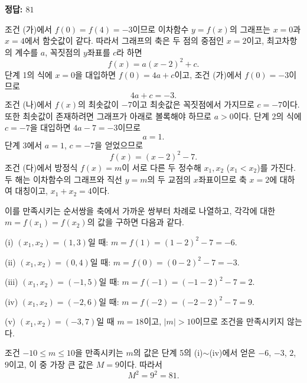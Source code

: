 \documentclass[10pt]{article}
\begin{document}
\begin{answerbox}\sffamily\bfseries 정답: $81$\end{answerbox}
 조건 (가)에서 $f(0) = f(4) = -3$이므로 이차함수 $y = f(x)$의 그래프는 $x = 0$과 $x = 4$에서 함숫값이 같다. 따라서 그래프의 축은 두 점의 중점인 $x = 2$이고, 최고차항의 계수를 $a$, 꼭짓점의 $y$좌표를 $c$라 하면
\[ f(x) = a(x - 2)^2 + c. \]
 단계 1의 식에 $x = 0$을 대입하면 $f(0) = 4a + c$이고, 조건 (가)에서 $f(0) = -3$이므로
\[ 4a + c = -3. \]
 조건 (나)에서 $f(x)$의 최솟값이 $-7$이고 최솟값은 꼭짓점에서 가지므로 $c = -7$이다. 또한 최솟값이 존재하려면 그래프가 아래로 볼록해야 하므로 $a > 0$이다. 단계 2의 식에 $c = -7$을 대입하면 $4a - 7 = -3$이므로
\[ a = 1. \]
 단계 3에서 $a = 1$, $c = -7$을 얻었으므로
\[ f(x) = (x - 2)^2 - 7. \]
 조건 (다)에서 방정식 $f(x) = m$이 서로 다른 두 정수해 $x_1, x_2$ ($x_1 < x_2$)를 가진다. 두 해는 이차함수의 그래프와 직선 $y = m$의 두 교점의 $x$좌표이므로 축 $x = 2$에 대하여 대칭이고, $x_1 + x_2 = 4$이다.

이를 만족시키는 순서쌍을 축에서 가까운 쌍부터 차례로 나열하고, 각각에 대한 $m = f(x_1) = f(x_2)$의 값을 구하면 다음과 같다.

(i) $(x_1, x_2) = (1, 3)$일 때: $m = f(1) = (1 - 2)^2 - 7 = -6$.

(ii) $(x_1, x_2) = (0, 4)$일 때: $m = f(0) = (0 - 2)^2 - 7 = -3$.

(iii) $(x_1, x_2) = (-1, 5)$일 때: $m = f(-1) = (-1 - 2)^2 - 7 = 2$.

(iv) $(x_1, x_2) = (-2, 6)$일 때: $m = f(-2) = (-2 - 2)^2 - 7 = 9$.

(v) $(x_1, x_2) = (-3, 7)$일 때 $m = 18$이고, $|m| > 10$이므로 조건을 만족시키지 않는다.

 조건 $-10 \le m \le 10$을 만족시키는 $m$의 값은 단계 5의 (i)$\sim$(iv)에서 얻은 $-6$, $-3$, $2$, $9$이고, 이 중 가장 큰 값은 $M = 9$이다. 따라서
\[ M^2 = 9^2 = 81. \]
\end{document}
